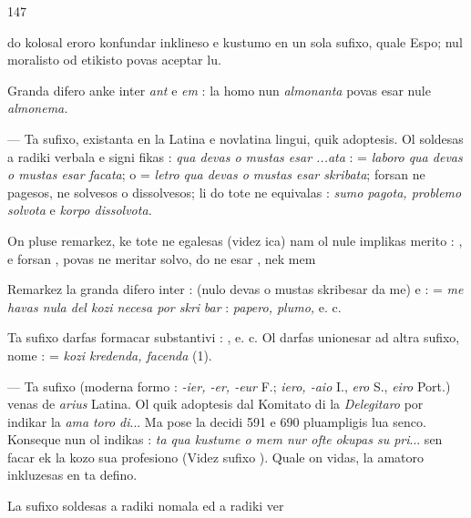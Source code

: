 \begin{VUpage}[151]{147}

\VUcontinue
do kolosal eroro konfundar inklineso e kustumo en un sola\nl
sufixo, quale Espo; nul moralisto od etikisto povas aceptar lu.\parplein

Granda difero anke inter \textit{ant} e \textit{em} : la homo nun \textit{almonanta}\nl
povas esar nule \textit{almonema.}

 --- Ta sufixo, existanta en la Latina e novlatina\nl
lingui, quik adoptesis. Ol soldesas a radiki verbala e signi\cc
fikas : \textit{qua devas o mustas esar ...ata} :  =\nl
\textit{laboro qua devas o mustas esar facata};  o \cc
{} = \textit{letro qua devas o mustas esar skribata}; \nl
{} forsan ne\nl
pagesos, ne solvesos o dissolvesos; li do tote ne equivalas :\nl
\textit{sumo pagota, problemo solvota} e \textit{korpo dissolvota.}

On pluse remarkez, ke  tote ne egalesas  (videz\nl
ica) nam ol nule implikas merito : , e\nl
forsan , povas ne meritar solvo, do ne esar ,\nl
nek mem 

Remarkez la granda difero inter : \cc
{} (nulo devas o mustas skribesar da me) e : \nl
{} = \textit{me havas nula del kozi necesa por skri}\cc
\textit{bar} : \textit{papero, plumo,} e. c.

Ta sufixo darfas formacar substantivi : \cc
{}, e. c. Ol darfas unionesar ad altra sufixo, nome\nl
{} :  = \textit{kozi kredenda, facenda} (1).

 --- Ta sufixo (moderna formo : \textit{-ier, -er, -eur} F.;\nl
\textit{\VUcorrige{}{-}iero, -aio} I., \textit{\VUcorrige{}{-}ero} S., \textit{\VUcorrige{}{-}eiro} Port.) venas de \textit{arius} Latina. Ol quik\nl
adoptesis dal Komitato di la \textit{Delegitaro} por indikar la \textit{ama}\cc
\textit{toro di}... Ma pose la decidi 591 e 690 pluampligis lua senco.\nl
Konseque nun ol indikas : \textit{ta qua kustume o mem nur ofte}\nl
\textit{okupas su pri}... sen facar ek la kozo sua profesiono (Videz\nl
sufixo ). Quale on vidas, la amatoro inkluzesas en ta\nl
defino.

La sufixo  soldesas a radiki nomala ed a radiki ver\cc
\end{VUpage}

